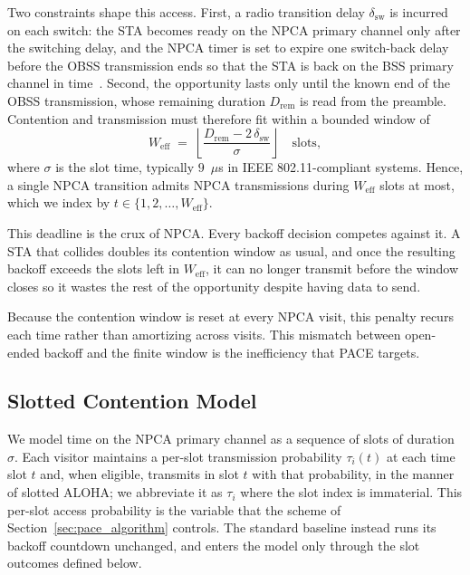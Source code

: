 \documentclass[conference]{IEEEtran}
\begin{document}
Two constraints shape this access. First, a radio transition delay $\delta_\mathrm{sw}$ is incurred on each switch: the STA becomes ready on the NPCA primary channel only after the switching delay, and the NPCA timer is set to expire one switch-back delay before the OBSS transmission ends so that the STA is back on the BSS primary channel in time~\cite{ieee80211bn}. Second, the opportunity lasts only until the known end of the OBSS transmission, whose remaining duration $D_\mathrm{rem}$ is read from the preamble. Contention and transmission must therefore fit within a bounded window of
\begin{equation}
    W_\mathrm{eff} \;=\; \left\lfloor
    \frac{D_\mathrm{rem}-2\,\delta_\mathrm{sw}}{\sigma} \right\rfloor
    \quad\text{slots},
    \label{eq:weff}
\end{equation}
where $\sigma$ is the slot time, typically $9$~$\mu$s in IEEE 802.11-compliant systems. Hence, a single NPCA transition admits NPCA transmissions during $W_\mathrm{eff}$ slots at most, which we index by $t \in \{1, 2, \dots, W_\mathrm{eff}\}$. 

This deadline is the crux of NPCA. Every backoff decision competes against it. A STA that collides doubles its contention window as usual, and once the resulting backoff exceeds the slots left in $W_\mathrm{eff}$, it can no longer transmit before the window closes so it wastes the rest of the opportunity despite having data to send.

Because the contention window is reset at every NPCA visit, this penalty recurs each time rather than amortizing across visits. This mismatch between open-ended backoff and the finite window is the inefficiency that PACE targets.

\subsection{Slotted Contention Model}
\label{subsec:npca_window}

We model time on the NPCA primary channel as a sequence of slots of duration $\sigma$. Each visitor maintains a per-slot transmission probability $\tau_i(t)$ at each time slot $t$ and, when eligible, transmits in slot $t$ with that probability, in the manner of slotted ALOHA; we abbreviate it as $\tau_i$ where the slot index is immaterial. This per-slot access probability is the variable that the scheme of Section~\ref{sec:pace_algorithm} controls. The standard baseline instead runs its backoff countdown unchanged, and enters the model only through the slot outcomes defined below.
\end{document}
